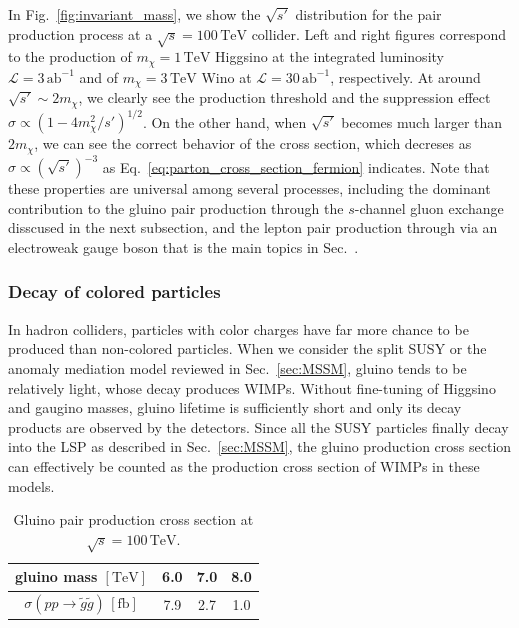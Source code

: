 \documentclass[12pt,twoside,book]{article}
\begin{document}
In Fig.~\ref{fig:invariant_mass}, we show the $\sqrt{s'}$ distribution for the pair production process at a $\sqrt{s} = 100\,\mathrm{TeV}$ collider.
Left and right figures correspond to the production of $m_\chi = 1\,\mathrm{TeV}$ Higgsino at the integrated luminosity $\mathcal{L} = 3\,\mathrm{ab}^{-1}$ and of $m_\chi = 3\,\mathrm{TeV}$ Wino at $\mathcal{L} = 30\,\mathrm{ab}^{-1}$, respectively.
At around $\sqrt{s'} \sim 2 m_\chi$, we clearly see the production threshold and the suppression effect $\sigma \propto (1-4 m_\chi^2 / s')^{1/2}$.
On the other hand, when $\sqrt{s'}$ becomes much larger than $2m_\chi$, we can see the correct behavior of the cross section, which decreses as $\sigma \propto (\sqrt{s'})^{-3}$ as Eq.~\eqref{eq:parton_cross_section_fermion} indicates.
Note that these properties are universal among several processes, including the dominant contribution  to the gluino pair production through the $s$-channel gluon exchange disscused in the next subsection, and the lepton pair production through via an electroweak gauge boson that is the main topics in Sec.~.






\subsubsection*{Decay of colored particles}

In hadron colliders, particles with color charges have far more chance to be produced than non-colored particles.
When we consider the split SUSY or the anomaly mediation model reviewed in Sec.~\ref{sec:MSSM}, gluino tends to be relatively light, whose decay produces WIMPs.
Without fine-tuning of Higgsino and gaugino masses, gluino lifetime is sufficiently short and only its decay products are observed by the detectors.
Since all the SUSY particles finally decay into the LSP as described in Sec.~\ref{sec:MSSM}, the gluino production cross section can effectively be counted as the production cross section of WIMPs in these models.

\begin{table}[t]
  \centering
  \begin{tabular}{c|ccc}
    gluino mass $\mathrm{[TeV]}$ & 6.0 & 7.0 & 8.0 \\ \hline
    $\sigma(p p \to \tilde{g} \tilde{g})\, \mathrm{[fb]}$ & 7.9 & 2.7 & 1.0
  \end{tabular}
  \caption{Gluino pair production cross section at $\sqrt{s} = 100\,\mathrm{TeV}$.}
  \label{tab:gluino_pair}
\end{table}
\end{document}
